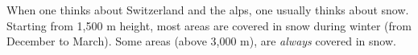 When one thinks about Switzerland and the alps, one usually thinks about snow.
Starting from 1,500 m height, most areas are covered in snow during winter (from December to March).
Some areas (above 3,000 m), are \emph{always} covered in snow.